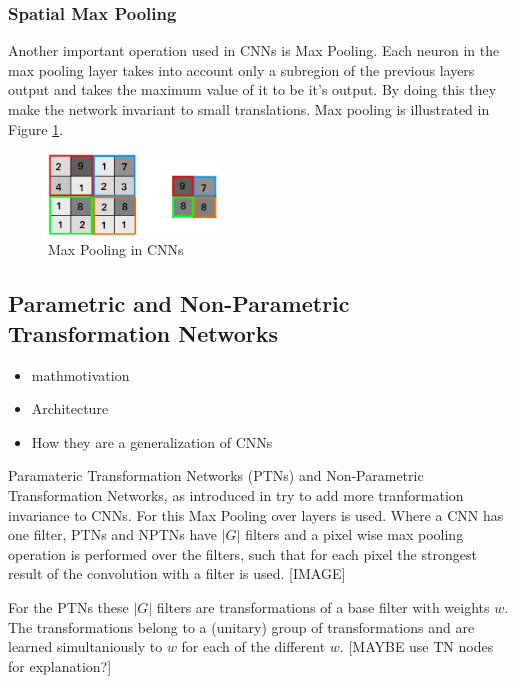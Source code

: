 \documentclass{llncs}
\begin{document}
\subsubsection{Spatial Max Pooling}
Another important operation used in CNNs is Max Pooling.
Each neuron in the max pooling layer takes into account only a subregion of the previous
layers output and takes the maximum value of it to be it's output. By doing this they make the network invariant to small translations. Max pooling is illustrated in Figure \ref{fig:maxpooling}.

\begin{figure}
	\begin{center}
		\includegraphics[width=0.40\textwidth]{result_images/maxpooling.jpg}
		\caption{Max Pooling in CNNs}
		\label{fig:maxpooling}
	\end{center}
\end{figure}

\subsection{Parametric and Non-Parametric Transformation Networks}
\begin{itemize}
  \item	mathmotivation
  \item Architecture
  \item How they are a generalization of CNNs
\end{itemize}

Paramateric Transformation Networks (PTNs) and Non-Parametric Transformation Networks, as introduced in \cite{NPTN} try to add more tranformation invariance to CNNs. For this Max Pooling over layers is used. 
Where a CNN has one filter, PTNs and NPTNs have $|G|$ filters and a pixel wise max pooling operation is performed over the filters, such that for each pixel the strongest result of the convolution with a filter is used. [IMAGE]

For the PTNs these $|G|$ filters are transformations of a base filter with weights $w$. The transformations belong to a (unitary) group of transformations and are learned simultaniously to $w$ for each of the different $w$. [MAYBE use TN nodes for explanation?]
\end{document}
